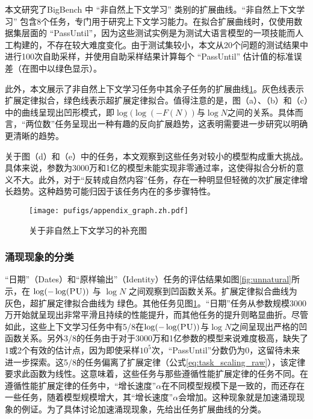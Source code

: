 本文研究了BigBench\citep{srivastava2022beyond} 中 “非自然上下文学习” 类别的扩展曲线。“非自然上下文学习” 包含8个任务，专门用于研究上下文学习能力。在拟合扩展曲线时，仅使用数据集层面的 “PassUntil”，因为这些测试实例是为测试大语言模型的一项技能而人工构建的，不存在较大难度变化。由于测试集较小，本文从20个问题的测试结果中进行100次自助采样，并使用自助采样结果计算每个 “PassUntil” 估计值的标准误差（在图中以绿色显示）。 

此外，本文展示了非自然上下文学习任务中其余子任务的扩展曲线\ref{fig:appendix_unnatural}。灰色线表示扩展定律拟合，绿色线表示超扩展定律拟合。值得注意的是，图（a）、（b）和（c）中的曲线呈现出凹形模式，即\(\log(\log(-F(N))\)与\(\log N\)之间的关系。具体而言，“两位数”任务呈现出一种有趣的反向扩展趋势，这表明需要进一步研究以明确更清晰的趋势。

{
关于图（d）和（e）中的任务，本文观察到这些任务对较小的模型构成重大挑战。具体来说，参数为3000万和1亿的模型未能实现非零通过率，这使得拟合分析的意义不大。此外，对于“反转成自然内容”任务，存在一种明显但轻微的次扩展定律增长趋势。这种趋势可能归因于该任务内在的多步骤特性。
}

\begin{figure}[!htbp]
        \centering
        \texttt{[image: pufigs/appendix\_graph.zh.pdf]}
    \caption{{关于非自然上下文学习的补充图}}
    \label{fig:appendix_unnatural}
\end{figure}

\subsubsection{涌现现象的分类}
“日期”（Dates）和“原样输出”（Identity）任务的评估结果如图\ref{fig:unnatural}所示，在 $\operatorname{log}(-\operatorname{log}(\textsc{PU}))$ 与 $\operatorname{log}N$ 之间观察到凹函数关系。扩展定律拟合曲线为 {\color[rgb]{0.55, 0.6, 0.6}灰色}，超扩展定律拟合曲线为 {\color[rgb]{0.3, 0.6, 0.45}绿色}。其他任务见图\ref{fig:appendix_unnatural}。“日期”任务从参数规模3000万开始就呈现出非常平滑且持续的性能提升，而其他任务的提升则略显曲折。尽管如此，这些上下文学习任务中有5/8在\(\log(-\log(\textsc{PU}))\)与\(\log N\)之间呈现出严格的凹函数关系。另外3/8的任务由于对于3000万和1亿参数的模型来说难度极高，缺失了1或2个有效的估计点，因为即使采样\(10^5\)次，“PassUntil”分数仍为0，这留待未来进一步探索。这5/8的任务偏离了扩展定律（公式\ref{eq:task_scaling_raw}），该定律要求此函数为线性。这意味着，这些任务与那些遵循性能扩展定律的任务不同。在遵循性能扩展定律的任务中，“增长速度”\(\alpha\)在不同模型规模下是一致的，而还存在一些任务，随着模型规模增大，其“增长速度”\(\alpha\)会增加。这种现象就是加速涌现现象的例证。为了具体讨论加速涌现现象，先给出任务扩展曲线的分类。

